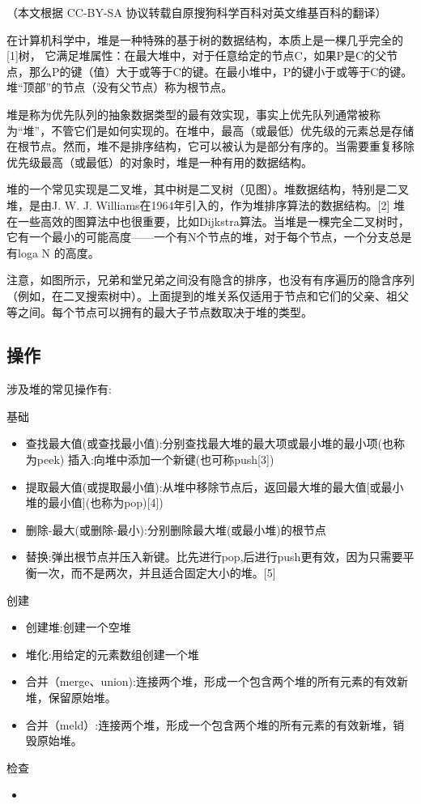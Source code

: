 
（本文根据 CC-BY-SA 协议转载自原搜狗科学百科对英文维基百科的翻译）

在计算机科学中，堆是一种特殊的基于树的数据结构，本质上是一棵几乎完全的[1]树， 它满足堆属性：在最大堆中，对于任意给定的节点C，如果P是C的父节点，那么P的键（值）大于或等于C的键。在最小堆中，P的键小于或等于C的键。堆“顶部”的节点（没有父节点）称为根节点。

堆是称为优先队列的抽象数据类型的最有效实现，事实上优先队列通常被称为“堆”，不管它们是如何实现的。在堆中，最高（或最低）优先级的元素总是存储在根节点。然而，堆不是排序结构，它可以被认为是部分有序的。当需要重复移除优先级最高（或最低）的对象时，堆是一种有用的数据结构。

堆的一个常见实现是二叉堆，其中树是二叉树（见图）。堆数据结构，特别是二叉堆，是由J. W. J. Williams在1964年引入的，作为堆排序算法的数据结构。[2] 堆在一些高效的图算法中也很重要，比如Dijkstra算法。当堆是一棵完全二叉树时，它有一个最小的可能高度——一个有N个节点的堆，对于每个节点，一个分支总是有loga N 的高度。

注意，如图所示，兄弟和堂兄弟之间没有隐含的排序，也没有有序遍历的隐含序列（例如，在二叉搜索树中）。上面提到的堆关系仅适用于节点和它们的父亲、祖父等之间。每个节点可以拥有的最大子节点数取决于堆的类型。

\subsection{操作}
涉及堆的常见操作有:

基础
\begin{itemize}
\item 查找最大值(或查找最小值):分别查找最大堆的最大项或最小堆的最小项(也称为peek)
插入:向堆中添加一个新键(也可称push[3])
\item 提取最大值(或提取最小值):从堆中移除节点后，返回最大堆的最大值[或最小堆的最小值](也称为pop)[4])
\item 删除-最大(或删除-最小):分别删除最大堆(或最小堆)的根节点
\item 替换:弹出根节点并压入新键。比先进行pop,后进行push更有效，因为只需要平衡一次，而不是两次，并且适合固定大小的堆。[5]
\end{itemize}

创建
\begin{itemize}
\item 创建堆:创建一个空堆
\item 堆化:用给定的元素数组创建一个堆
\item 合并（merge、union):连接两个堆，形成一个包含两个堆的所有元素的有效新堆，保留原始堆。
\item 合并（meld）:连接两个堆，形成一个包含两个堆的所有元素的有效新堆，销毁原始堆。
\end{itemize}

检查
\begin{itemize}
\item 
\end{itemize}
